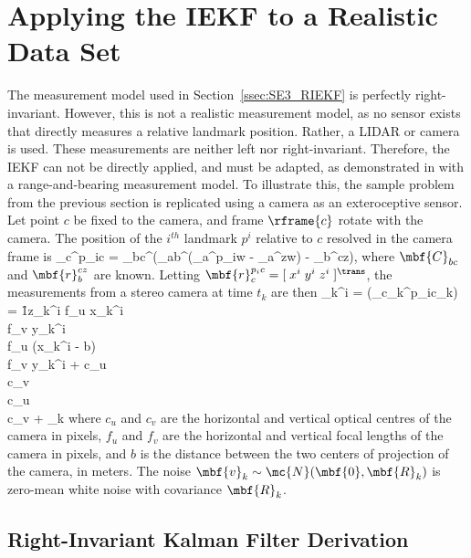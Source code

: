 \FloatBarrier

\section{Applying the IEKF to a Realistic Data Set}
\label{sec:se3_real_data}

The measurement model used in Section~\ref{ssec:SE3_RIEKF} is perfectly right-invariant. However, this is not a realistic measurement model, as no sensor exists that directly measures a relative landmark position. Rather, a LIDAR or camera is used. These measurements are neither left nor right-invariant. Therefore, the IEKF can not be directly applied, and must be adapted, as demonstrated in \cite{Barrau2015aa} with a range-and-bearing measurement model. To illustrate this, the sample problem from the previous section is replicated using a camera as an exteroceptive sensor. Let point $c$ be fixed to the camera, and frame $\rframe{c}$ rotate with the camera. The position of the $i^{th}$ landmark $p^i$ relative to $c$ resolved in the camera frame is 
\beq
	_{c}^{p_ic} = _{bc}^\trans(_{ab}^\trans(_a^{p_iw} - _a^{zw}) - _b^{cz}), \label{eq:se3_real_meas_1}
\eeq
where $\mbf{C}_{bc}$ and $\mbf{r}_b^{cz}$ are known. Letting $\mbf{r}_c^{p_ic} = [ \; x^i \; y^i \; z^i \; ]^\trans$, the measurements from a stereo camera at time $t_k$ are then \cite[p. 208]{Barfoot2017}
\beq
	_k^i = (_{c_k}^{p_ic_k}) =  \f{1}{z_k^i}
		f_u x_k^i \\
		f_v y_k^i \\ 
		f_u (x_k^i - b) \\
		f_v y_k^i
	\ema
	+
		c_u \\
		c_v \\ 
		c_u \\
		c_v 
	\ema + _k\label{eq:se3_real_meas}
\eeq
where $c_u$ and $c_v$ are the horizontal and vertical optical centres of the camera in pixels, $f_u$ and $f_v$ are the horizontal and vertical focal lengths of the camera in pixels, and $b$ is the distance between the two centers of projection of the camera, in meters. The noise $\mbf{v}_k \sim \mc{N}(\mbf{0},\mbf{R}_k)$ is zero-mean white noise with covariance $\mbf{R}_k$. 

\subsection{Right-Invariant Kalman Filter Derivation}

